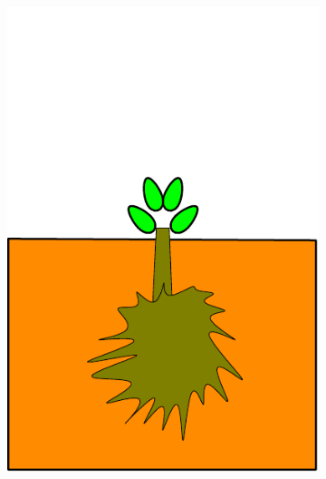 \documentclass[10pt]{article}
\begin{document}
\begin{figure}[!ht]
\begin{subfigure}[b]{.1125\linewidth}
\includegraphics[width=1.0\linewidth]{img/tree_pics_6}
\caption{}  %
\label{fig:grow_6}
\end{subfigure}
\begin{subfigure}[b]{.1125\linewidth}
\centering

\end{subfigure}
\end{figure}
\end{document}
